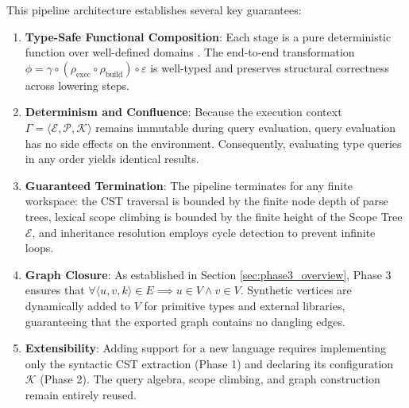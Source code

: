 This pipeline architecture establishes several key guarantees:
\begin{enumerate}
  \item \textbf{Type-Safe Functional Composition}: Each stage is a
    pure deterministic
    function over well-defined domains \cite{pierce_types_2002}. The
    end-to-end transformation
    $\phi = \gamma \circ (\rho_{\text{exec}} \circ
    \rho_{\text{build}}) \circ \varepsilon$
    is well-typed and preserves structural correctness across lowering steps.
  \item \textbf{Determinism and Confluence}: Because the execution context
    $\Gamma = \langle \mathcal{E}, \mathcal{P}, \mathcal{K} \rangle$
    remains immutable
    during query evaluation, query evaluation has no side effects on
    the environment.
    Consequently, evaluating type queries in any order yields identical results.
  \item \textbf{Guaranteed Termination}: The pipeline terminates for
    any finite work\-space:
    the CST traversal is bounded by the finite node depth of parse
    trees, lexical scope climbing
    is bounded by the finite height of the Scope Tree $\mathcal{E}$,
    and inheritance resolution
    employs cycle detection to prevent infinite loops.
  \item \textbf{Graph Closure}: As established in Section
    \ref{sec:phase3_overview},
    Phase 3 ensures that $\forall \langle u, v, k \rangle \in E
    \implies u \in V \land v \in V$.
    Synthetic vertices are dynamically added to $V$ for primitive
    types and external libraries,
    guaranteeing that the exported graph contains no dangling edges.
  \item \textbf{Extensibility}: Adding support for a new language
    requires implementing
    only the syntactic CST extraction (Phase 1) and declaring its
    configuration $\mathcal{K}$
    (Phase 2). The query algebra, scope climbing, and graph
    construction remain entirely reused.
\end{enumerate}
